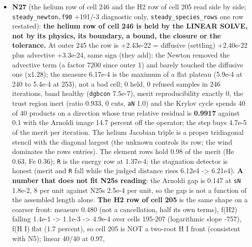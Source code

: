 \documentclass[english,a4paper]{my_memo}
\begin{document}
\begin{itemize}
  source tree with \texttt{steady\_newton.f90} pinned, because N27 was editing it.
  Advisor: rebuild warning-free, \texttt{element\_operator} 5/0, \texttt{certification}
  29/0 on \texttt{build\_lwv}; one \texttt{percent} fixed. Reported: the write-back\textquotesingle s ghost
  is the cell\textquotesingle s to round-off, not exactly (any other consumer of those
  ghosts reads a 2e-16 gradient).
\item
  \textbf{N27} (the helium row of cell 246 and the H2 row of cell 205 read side by
  side; \texttt{steady\_newton.f90} +191/-3 diagnostic only, \texttt{steady\_species\_rows}
  one row restated): \textbf{the helium row of cell 246 is held by the LINEAR
  SOLVE, not by its physics, its boundary, a bound, the closure or the
  tolerance.} At outer 245 the row is +2.43e-22 = diffusive (settling)
  +2.40e-22 plus advective +3.3e-24, same sign (they add); the Newton removed
  the advective term (a factor 7200 since outer 1) and barely touched the
  diffusive one (x1.28); the measure 6.17e-4 is the maximum of a flat plateau
  (5.9e-4 at 240 to 5.4e-4 at 253), not a bad cell; 0 held, 0 refused samples
  in 246 iterations, band healthy (\texttt{dgbcon} 7.5e-7), merit reproducibility
  exactly 0, the trust region inert (ratio 0.933, 0 cuts, \texttt{aN} 1.0) and the
  Krylov cycle spends 40 of 40 products on a direction whose true relative
  residual is \textbf{0.9917} against 0.1 with the Arnoldi image 14.7 percent off
  the operator; the step buys 4.7e-5 of the merit per iteration. The
  helium Jacobian triple is a proper tridiagonal stencil with the diagonal
  largest (the unknown controls its row; the wind dominates the row\textquotesingle s
  entries). The element rows hold 0.98 of the merit (He 0.63, Fe 0.36);
  \texttt{\textbar{}\textbar{}R\textbar{}\textbar{}} is the energy row at 1.37e-4; the stagnation detector is honest
  (merit and \texttt{\textbar{}\textbar{}R\textbar{}\textbar{}} fall while the judged distance rises 6.12e4 -\textgreater{} 6.21e4).
  \textbf{A number that does not fit N25\textquotesingle s reading}: the Arnoldi gap is 0.147 at
  \texttt{\textbar{}\textbar{}sN\textbar{}\textbar{}} 1.8e-2, 8 per unit against N25\textquotesingle s 2.5e-4 per unit, so the gap is
  not a function of the assembled length alone. \textbf{The H2 row of cell 205}
  is the same shape on a coarser front: measure 0.480 (not a cancellation,
  half its own terms), f(H2) falling 1.4e-1 -\textgreater{} 1.1e-3 -\textgreater{} 4.9e-4 over cells
  195-207 (logarithmic slope -757), f(H I) flat (1.7 percent), so cell 205
  is NOT a two-root H I front (consistent with N5); linear 40/40 at 0.97,

\end{itemize}
\end{document}
